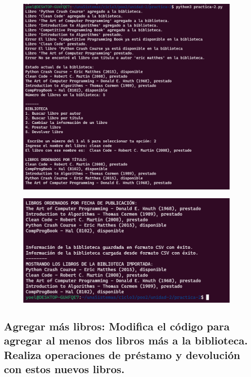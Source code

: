 \documentclass[11pt,a4paper]{article}
\begin{document}
\begin{figure}[H]
    \centering
    \includegraphics[width=1\linewidth]{images/compilado.png}
    \caption{}
    \label{fig:enter-label}
\end{figure}

\begin{figure}[H]
    \centering
    \includegraphics[width=0.8\linewidth]{images/compilado-2.png}
    \caption{}
    \label{fig:enter-label}
\end{figure}

\subsection{Agregar más libros:
Modifica el código para agregar al menos dos libros más a la biblioteca.
Realiza operaciones de préstamo y devolución con estos nuevos libros.}
\end{document}
